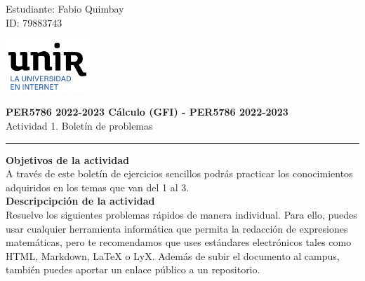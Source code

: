\documentclass[11pt,letterpaper]{article}
\begin{document}
\pagestyle{plain}

\begin{flushleft}
Estudiante: Fabio Quimbay\\
ID: 79883743
\end{flushleft}

\begin{flushright}\vspace{-15mm}
\includegraphics[height=2cm]{logo.png}
\end{flushright}
 
\begin{center}\vspace{0cm}
\textbf{\large PER5786 2022-2023  Cálculo (GFI) - PER5786 2022-2023}\\
Actividad 1. Boletín de problemas
\end{center}

 
\rule{\linewidth}{0.1mm}

\bigskip
\bigskip

\textbf{Objetivos de la actividad}\\

A través de este boletín de ejercicios sencillos podrás practicar los conocimientos adquiridos en los temas que van del 1 al 3.\\

\textbf{Descripcipción de la actividad}\\

Resuelve los siguientes problemas rápidos de manera individual. Para ello, puedes usar cualquier herramienta informática que permita la redacción de expresiones matemáticas, pero te recomendamos que uses estándares electrónicos tales como HTML, Markdown, LaTeX o LyX. Además de subir el documento al campus, también puedes aportar un enlace público a un repositorio. 

\end{document}
